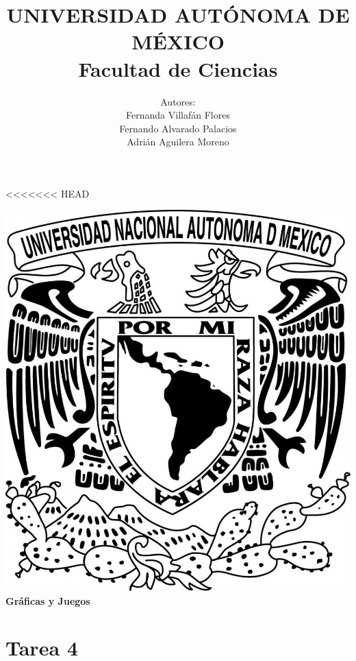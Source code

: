 \documentclass{article}
\begin{document}
<<<<<<< HEAD
\title{UNIVERSIDAD AUT\'ONOMA DE M\'EXICO\\ Facultad de Ciencias}
\author{Autores:
  \\ Fernanda Villaf\'an Flores
  \\ Fernando Alvarado Palacios
  \\ Adri\'an Aguilera Moreno}
\date{}
\maketitle
\begin{center}
  \includegraphics[scale=0.20]{../Imagen/Portada.jpg}\\[0.4cm]
  \Large
  \bf{Gr\'aficas y Juegos}
  \normalsize
\end{center}
\newpage
{}
\section*{\LARGE{Tarea 4}}
\end{document}
